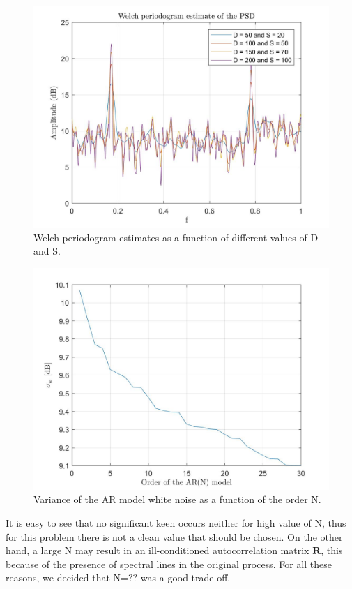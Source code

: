 \documentclass[a4paper,11pt,openright,twoside]{report}
\begin{document}
\begin{figure}
	\centering
	\includegraphics[width=14cm]{images/Welch_vs_SD.jpg}
	\caption{Welch periodogram estimates as a function of different values of D and S.}\label{WelchSD}
\end{figure}
\begin{figure}[h]
	\centering
	\includegraphics[width=14cm]{images/sigma_vs_N.jpg}
	\caption{Variance of the AR model white noise as a function of the order N.}\label{sigmavsN}
\end{figure}

It is easy to see that no significant keen occurs neither for high value of N, thus for this problem there is not a clean value that should be chosen. On the other hand, a large N may result in an ill-conditioned autocorrelation matrix $\mathbf{R}$, this because of the presence of spectral lines in the original process.
For all these reasons, we decided that N=?? was a good trade-off.
\end{document}
